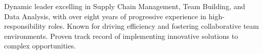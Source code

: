 

\begin{cvparagraph}
	
	Dynamic leader excelling in Supply Chain Management, Team Building, and Data Analysis, with over eight years of progressive experience in high-responsibility roles. Known for driving efficiency and fostering collaborative team environments. Proven track record of implementing innovative solutions to complex opportunities.
\end{cvparagraph}